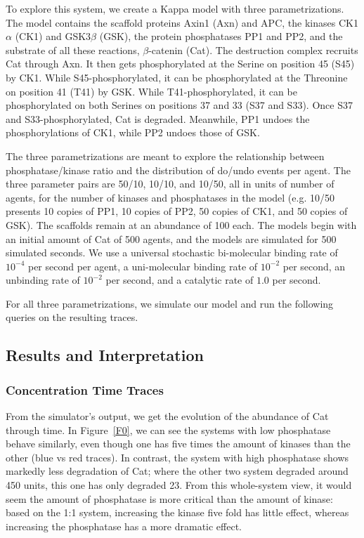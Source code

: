 To explore this system, we create a Kappa model with three
parametrizations. The model contains the scaffold proteins Axin1 (Axn)
and APC, the kinases CK1$\alpha$ (CK1) and GSK3$\beta$ (GSK), the
protein phosphatases PP1 and PP2, and the substrate of all these
reactions, $\beta$-catenin (Cat). The destruction complex recruits
Cat through Axn. It then gets phosphorylated at the Serine on position
45 (S45) by CK1. While S45-phosphorylated, it can be phosphorylated at
the Threonine on position 41 (T41) by GSK. While T41-phosphorylated,
it can be phosphorylated on both Serines on positions 37 and 33 (S37 and
S33). Once S37 and S33-phosphorylated, Cat is degraded. Meanwhile, PP1
undoes the phosphorylations of CK1, while PP2 undoes those of GSK.

The three parametrizations are meant to explore the relationship
between phosphatase/kinase ratio and the distribution of do/undo
events per agent. The three parameter pairs are 50/10, 10/10, and
10/50, all in units of number of agents, for the number of kinases and
phosphatases in the model (e.g. 10/50 presents 10 copies of PP1, 10
copies of PP2, 50 copies of CK1, and 50 copies of GSK). The scaffolds
remain at an abundance of 100 each. The models begin with an initial
amount of Cat of 500 agents, and the models are simulated for 500
simulated seconds. We use a universal stochastic bi-molecular binding
rate of $10^{-4}$ per second per agent, a uni-molecular binding rate
of $10^{-2}$ per second, an unbinding rate of $10^{-2}$ per second,
and a catalytic rate of $1.0$ per second. 

For all three parametrizations, we simulate our model and run the
following queries on the resulting traces.



\subsection{Results and Interpretation}

\subsubsection*{Concentration Time Traces}
From the simulator’s output, we get the evolution of the abundance of
Cat through time. In Figure~\ref{F0}, we can see the systems with low phosphatase
behave similarly, even though one has five times the amount of kinases
than the other (blue vs red traces). In contrast, the system with high
phosphatase shows markedly less degradation of Cat; where the other
two system degraded around 450 units, this one has only degraded
23. From this whole-system view, it would seem the amount of
phosphatase is more critical than the amount of kinase: based on the
1:1 system, increasing the kinase five fold has little effect, whereas
increasing the phosphatase has a more dramatic effect.



